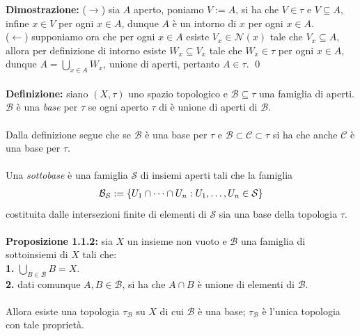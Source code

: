 \documentclass{article}
\begin{document}
\textbf{Dimostrazione:} ($\rightarrow$) sia $A$ aperto, poniamo $V := A$, si ha che $V \in \tau$ e $V \subseteq A$, infine $x \in V$ per ogni $x \in A$, dunque $A$ è un intorno di $x$ per ogni $x \in A$. \\
($\leftarrow$) supponiamo ora che per ogni $x \in A$ esiste $V_x \in \mathcal{N}(x)$ tale che $V_x \subseteq A$, allora per definizione di intorno esiste $W_x \subseteq V_x$ tale che $W_x \in \tau$ per ogni $x \in A$, dunque $A = \bigcup_{x \in A} W_x$, unione di aperti, pertanto $A \in \tau$. \qed \\ \\
\textbf{Definizione:} siano $(X, \tau)$ uno spazio topologico e $\mathcal{B} \subseteq \tau$ una famiglia di aperti. $\mathcal{B}$ è una \textit{base} per $\tau$ se ogni aperto $\tau$ di è unione di aperti di $\mathcal{B}$. \\ \\
Dalla definizione segue che se $\mathcal{B}$ è una base per $\tau$ e $\mathcal{B} \subset \mathcal{C} \subset \tau$ si ha che anche $\mathcal{C}$ è una base per $\tau$. \\ \\
Una \textit{sottobase} è una famiglia $\mathcal{S}$ di insiemi aperti tali che la famiglia
\begin{gather}
    \mathcal{B}_\mathcal{S} := \{ U_1 \cap \dots \cap U_n : U_1, \dots , U_n \in \mathcal{S} \} \notag
\end{gather}
costituita dalle intersezioni finite di elementi di $\mathcal{S}$ sia una base della topologia $\tau$. \\ \\
\textbf{Proposizione 1.1.2:} sia $X$ un insieme non vuoto e $\mathcal{B}$ una famiglia di sottoinsiemi di $X$ tali che: \\
\textbf{1.} $\bigcup_{B \in \mathcal{B}} B = X$. \\
\textbf{2.} dati comunque $A, B \in \mathcal{B}$, si ha che $A \cap B$ è unione di elementi di $\mathcal{B}$. \\ \\
Allora esiste una topologia $\tau_\mathcal{B}$ su $X$ di cui $\mathcal{B}$ è una base; $\tau_\mathcal{B}$ è l'unica topologia con tale proprietà. \\
\end{document}
